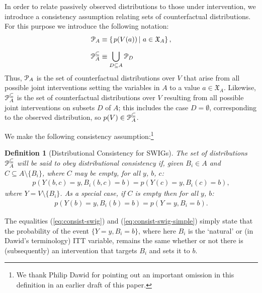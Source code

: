 \documentclass[11pt]{article}
\newtheorem{definition}[theorem]{Definition}
\begin{document}
In order to relate passively observed distributions to those under intervention, we introduce a consistency assumption relating 
sets of counterfactual distributions. For this purpose we introduce the following notation:
\begin{align}
{\cal P}_A &\equiv \left\{\left.p(V({a})) \,\right|\, {a} \in \mathfrak{X}_A\right\},\\[6pt]
{\cal P}^{\tiny \subseteq}_A &\equiv \bigcup_{D\subseteq A} {\cal P}_D
\end{align}
Thus, ${\cal P}_A$ is the set of counterfactual distributions over $V$ that arise from all possible joint interventions setting the  variables in $A$ to a value ${a} \in \mathfrak{X}_A$. Likewise, ${\cal P}^{\subseteq}_A $ is the set of counterfactual distributions over $V$ resulting from all possible joint interventions on subsets $D$ of $A$; this includes the case $D=\emptyset$, corresponding to the observed distribution, so $p(V) \in {\cal P}^{\subseteq}_A $.

We make the following consistency assumption:\footnote{We thank Philip Dawid for pointing out an important omission in this definition in an earlier draft of this paper.}
\begin{definition}[Distributional Consistency for SWIGs]
The set of distributions ${\cal P}^{\subseteq}_A $ will be said to obey distributional consistency if, 
given  $B_i\in A$ and $C\subseteq  A\setminus \{B_i\}$, where $C$ may be empty, 
for all $y$, $b$, $c$:
\begin{align}\label{eq:consist-swig}
p(Y({ b},{ c})\!=\!y, B_i({ b},{ c}) \!=\! { b}) = p(Y({ c})\!=\!y, B_i({ c}) \!=\! { b}),
\end{align}
where $Y=V\setminus \{B_i\}$.
As a special case, if $C$ is empty then for all $y$, $b$:
\begin{align}\label{eq:consist-swig-simple}
p(Y({ b})\!=\!y , B_i({ b}) \!=\! { b}) = p(Y\!=\!y, B_i \!=\! { b}).
\end{align}

\end{definition}

The equalities (\ref{eq:consist-swig}) and (\ref{eq:consist-swig-simple}) simply state that the probability of the event $\{Y=y, B_i=b\}$, where here $B_i$ is the `natural' or (in Dawid's terminology) ITT variable, remains the same whether or not there is (subsequently) an intervention that  targets $B_i$ and sets it to $b$. 
\end{document}
